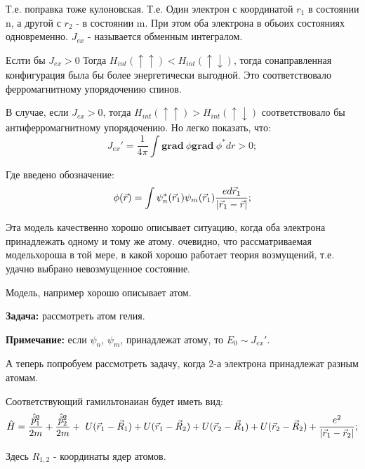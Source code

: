 \documentclass[a4paper, 14pt, russian]{article}
\newcommand{\be}{\begin{equation}}
\newcommand{\ee}{\end{equation}}
\renewcommand{\grad}{\textbf{grad}~}
\begin{document}
	Т.е. поправка тоже кулоновская. Т.е. Один электрон с координатой $r_1$ в состоянии n,
	а другой с $r_2$ - в состоянии m. При этом оба электрона в обьоих состояниях 
	одновременно. $J_{ex}$ - называется обменным интегралом.

	Еслти бы $J_{ex} >0$ Тогда $H_{int} (\uparrow \uparrow) < H_{int} (\uparrow \downarrow)$,
	тогда сонаправленная конфигурация была бы более энергетически выгодной. Это соответствовало
	ферромагнитному упорядочению спинов.

	В случае, если $J_{ex} >0$, тогда $H_{int} (\uparrow \uparrow) > H_{int} (\uparrow \downarrow)$
	соответствовало бы антиферромагнитному упорядочению.
	Но легко показать, что:
	\be
		J_{ex}' = \frac{1}{4\pi} \int \grad \phi \grad \phi ^{*} dr >0;
	\ee

	Где введено обозначение:
	\be
		\phi(\vec r) = \int \psi_n^{*} (\vec{r}_1) \psi_m(\vec{r}_1) \frac{e d\vec{r}_1}{\abs{\vec{r}_1 - \vec{r}}};
	\ee

	Эта модель качественно хорошо описывает ситуацию, когда оба электрона
	принадлежать  одному и тому же атому. очевидно, что рассматриваемая модельхороша в той мере, в какой
	хорошо работает теория возмущений, т.е. удачно выбрано невозмущенное
	состояние. 


	Модель, например хорошо описывает атом.
	\begin{tcolorbox}
		\textbf{Задача:} рассмотреть атом гелия.

		\textbf{Примечание:} если $\psi_n$, $\psi_m$,
		принадлежат атому, то $E_0 \sim J_{ex}'$.
	\end{tcolorbox}

	А теперь попробуем рассмотреть задачу, когда 2-а электрона принадлежат разным
	атомам. 

	Соответствующий гамильтонаиан будет иметь вид:
	\be
		\hat{H} = \frac{\hat{\vec p}_1^2}{2m} + \frac{\hat{\vec p}_2^2}{2m} + \
			U(\vec{r}_1 - \vec{R}_1) + U(\vec{r}_1 - \vec{R}_2) + 
			U(\vec{r}_2 - \vec{R}_1) + U(\vec{r}_2 - \vec{R}_2) + 
			\frac{e^2}{\abs{\vec{r}_1 - \vec{r}_2}};
	\ee

	Здесь $R_{1,2}$ - координаты ядер атомов.
\end{document}
